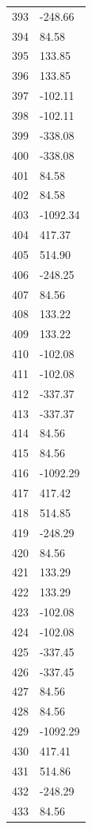 \documentclass[a4paper,11pt]{article}
\begin{document}
\begin{center}
\begin{longtable}{|R{1.5cm}|R{2.5cm}|}
  393 &      -248.66 \\
  394 &        84.58 \\
  395 &       133.85 \\
  396 &       133.85 \\
  397 &      -102.11 \\
  398 &      -102.11 \\
  399 &      -338.08 \\
  400 &      -338.08 \\
  401 &        84.58 \\
  402 &        84.58 \\
  403 &     -1092.34 \\
  404 &       417.37 \\
  405 &       514.90 \\
  406 &      -248.25 \\
  407 &        84.56 \\
  408 &       133.22 \\
  409 &       133.22 \\
  410 &      -102.08 \\
  411 &      -102.08 \\
  412 &      -337.37 \\
  413 &      -337.37 \\
  414 &        84.56 \\
  415 &        84.56 \\
  416 &     -1092.29 \\
  417 &       417.42 \\
  418 &       514.85 \\
  419 &      -248.29 \\
  420 &        84.56 \\
  421 &       133.29 \\
  422 &       133.29 \\
  423 &      -102.08 \\
  424 &      -102.08 \\
  425 &      -337.45 \\
  426 &      -337.45 \\
  427 &        84.56 \\
  428 &        84.56 \\
  429 &     -1092.29 \\
  430 &       417.41 \\
  431 &       514.86 \\
  432 &      -248.29 \\
  433 &        84.56 \\

\end{longtable}
\end{center}
\end{document}
